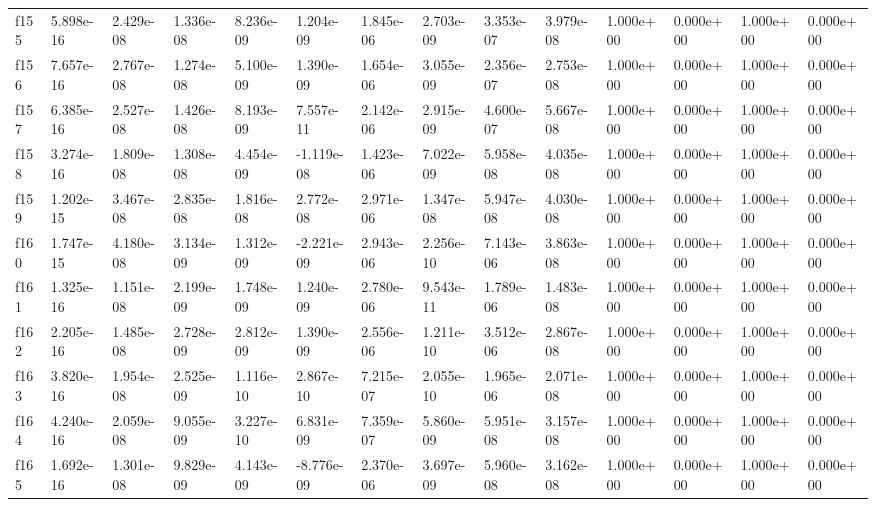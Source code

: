 \begin{table}
\begin{tabular}{llllllllllllll}
f155 & 5.898e-16 & 2.429e-08 & 1.336e-08 & 8.236e-09 & 1.204e-09 & 1.845e-06 & 2.703e-09 & 3.353e-07 & 3.979e-08 & 1.000e+00 & 0.000e+00 & 1.000e+00 & 0.000e+00 \\
f156 & 7.657e-16 & 2.767e-08 & 1.274e-08 & 5.100e-09 & 1.390e-09 & 1.654e-06 & 3.055e-09 & 2.356e-07 & 2.753e-08 & 1.000e+00 & 0.000e+00 & 1.000e+00 & 0.000e+00 \\
f157 & 6.385e-16 & 2.527e-08 & 1.426e-08 & 8.193e-09 & 7.557e-11 & 2.142e-06 & 2.915e-09 & 4.600e-07 & 5.667e-08 & 1.000e+00 & 0.000e+00 & 1.000e+00 & 0.000e+00 \\
f158 & 3.274e-16 & 1.809e-08 & 1.308e-08 & 4.454e-09 & -1.119e-08 & 1.423e-06 & 7.022e-09 & 5.958e-08 & 4.035e-08 & 1.000e+00 & 0.000e+00 & 1.000e+00 & 0.000e+00 \\
f159 & 1.202e-15 & 3.467e-08 & 2.835e-08 & 1.816e-08 & 2.772e-08 & 2.971e-06 & 1.347e-08 & 5.947e-08 & 4.030e-08 & 1.000e+00 & 0.000e+00 & 1.000e+00 & 0.000e+00 \\
f160 & 1.747e-15 & 4.180e-08 & 3.134e-09 & 1.312e-09 & -2.221e-09 & 2.943e-06 & 2.256e-10 & 7.143e-06 & 3.863e-08 & 1.000e+00 & 0.000e+00 & 1.000e+00 & 0.000e+00 \\
f161 & 1.325e-16 & 1.151e-08 & 2.199e-09 & 1.748e-09 & 1.240e-09 & 2.780e-06 & 9.543e-11 & 1.789e-06 & 1.483e-08 & 1.000e+00 & 0.000e+00 & 1.000e+00 & 0.000e+00 \\
f162 & 2.205e-16 & 1.485e-08 & 2.728e-09 & 2.812e-09 & 1.390e-09 & 2.556e-06 & 1.211e-10 & 3.512e-06 & 2.867e-08 & 1.000e+00 & 0.000e+00 & 1.000e+00 & 0.000e+00 \\
f163 & 3.820e-16 & 1.954e-08 & 2.525e-09 & 1.116e-10 & 2.867e-10 & 7.215e-07 & 2.055e-10 & 1.965e-06 & 2.071e-08 & 1.000e+00 & 0.000e+00 & 1.000e+00 & 0.000e+00 \\
f164 & 4.240e-16 & 2.059e-08 & 9.055e-09 & 3.227e-10 & 6.831e-09 & 7.359e-07 & 5.860e-09 & 5.951e-08 & 3.157e-08 & 1.000e+00 & 0.000e+00 & 1.000e+00 & 0.000e+00 \\
f165 & 1.692e-16 & 1.301e-08 & 9.829e-09 & 4.143e-09 & -8.776e-09 & 2.370e-06 & 3.697e-09 & 5.960e-08 & 3.162e-08 & 1.000e+00 & 0.000e+00 & 1.000e+00 & 0.000e+00 \\
\bottomrule
\end{tabular}
\end{table}
